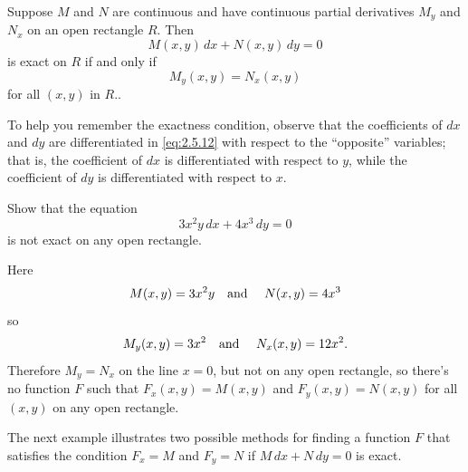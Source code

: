 \documentclass{ximera}
\begin{document}
\begin{theorem}\label{thmtype:2.5.2}
Suppose  $M$ and
$N$ are continuous and have continuous partial derivatives
$M_y$ and $N_x$ on an open rectangle $R.$ Then
$$
M(x,y)\,dx+N(x,y)\,dy=0
$$
is exact on $R$ if and only if
\begin{equation} \label{eq:2.5.12}
M_y(x,y)=N_x(x,y)
\end{equation}
for all $(x,y)$ in  $R.$.
\end{theorem}

To help you  remember the exactness condition, observe
that the coefficients of $dx$ and $dy$ are differentiated in
\eqref{eq:2.5.12} with respect to the ``opposite'' variables; that is,
the coefficient of $dx$ is differentiated with respect to $y$, while the
coefficient of $dy$ is differentiated with respect to $x$.

\begin{example}\label{example:2.5.2}
 Show that the equation
$$
3x^2y\,dx+4x^3\,dy=0
$$
is not exact on any open rectangle.

\begin{explanation}   Here
$$
M(x,y)=3x^2y\mbox{\quad and \quad} N(x,y)=4x^3
$$
so
$$
M_y(x,y)=3x^2 \mbox{\quad and \quad} N_x(x,y)=12 x^2.
$$
Therefore  $M_y=N_x$   on the line $x=0$,
but not on any open rectangle, so
there's no
function $F$ such that $F_x(x,y)=M(x,y)$ and $F_y(x,y)=N(x,y)$
for all $(x,y)$ on any open rectangle.
\end{explanation}
\end{example}

The next example illustrates two possible methods for finding a
function $F$ that satisfies the condition $F_x=M$ and $F_y=N$ if
$M\,dx+N\,dy=0 $ is exact.
\end{document}
